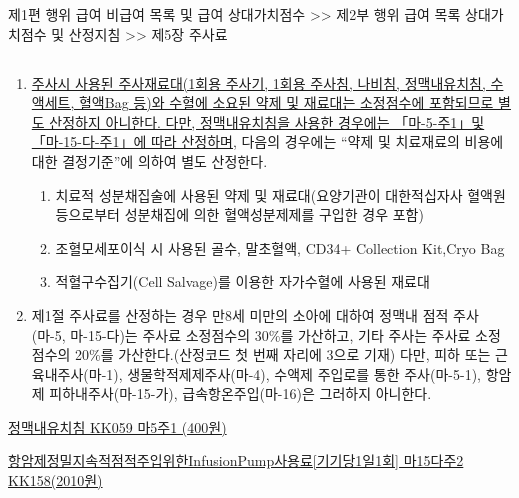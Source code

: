 \begin{mdframed}[linecolor=blue,middlelinewidth=2]  
제1편 행위 급여 \cntrdot{}  비급여 목록 및 급여 상대가치점수 >> 제2부 행위 급여 목록\cntrdot{} 상대가치점수 및 산정지침 >> 제5장 주사료
\end{mdframed}

\subsection{}
\begin{enumerate}[(1)]\tightlist
\item \uline{주사시 사용된 주사재료대(1회용 주사기, 1회용 주사침, 나비침, 정맥내유치침, 수액세트, 혈액Bag 등)와 수혈에 소요된 약제 및 재료대는 소정점수에 포함되므로 별도 산정하지 아니한다. 다만, 정맥내유치침을 사용한 경우에는 「마-5-주1」및「마-15-다-주1」에 따라 산정하며,} 다음의 경우에는 “약제 및 치료재료의 비용에 대한 결정기준”에 의하여 별도 산정한다.
	\begin{enumerate}[(가)]\tightlist
	\item 치료적 성분채집술에 사용된 약제 및 재료대(요양기관이 대한적십자사 혈액원 등으로부터 성분채집에 의한 혈액성분제제를 구입한 경우 포함)
	\item 조혈모세포이식 시 사용된 골수, 말초혈액, CD34+ Collection Kit,Cryo Bag
	\item 적혈구수집기(Cell Salvage)를 이용한 자가수혈에 사용된 재료대
	\end{enumerate}
\item 제1절 주사료를 산정하는 경우 만8세 미만의 소아에 대하여 정맥내 점적 주사(마-5, 마-15-다)는 주사료 소정점수의 30\%를 가산하고, 기타 주사는 주사료 소정점수의 20\%를 가산한다.(산정코드 첫 번째 자리에 3으로 기재) 다만, 피하 또는 근육내주사(마-1), 생물학적제제주사(마-4), 수액제 주입로를 통한 주사(마-5-1), 항암제 피하내주사(마-15-가), 급속항온주입(마-16)은 그러하지 아니한다.
\end{enumerate}
\uline{정맥내유치침 KK059 마5주1 (400원)} \par
\uline{항암제정밀지속적점적주입위한InfusionPump사용료[기기당1일1회] 마15다주2 KK158(2010원)}\par